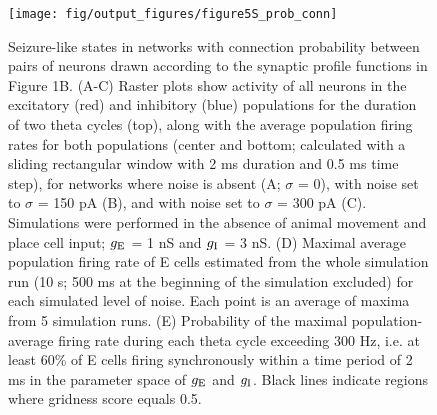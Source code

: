 \documentclass[a4paper,12pt]{article}
\newcommand{\ssc}[3]{\ensuremath{#1_{\text{#2}_{\text{#3}}}}}
\newcommand{\gE      }{\ssc{g}      {\scriptsize{E}}{}}
\newcommand{\gI      }{\ssc{g}      {\scriptsize{I}}{}}
\begin{document}
\clearpage

\begin{figure}[p]
    \internallinenumbers
    \centering
        \texttt{[image: fig/output\_figures/figure5S\_prob\_conn]}
\end{figure}

\clearpage

\begin{figure}[H]
    \internallinenumbers
    \caption{Seizure-like states in networks with connection probability
    between pairs of neurons drawn according to the synaptic profile functions
    in Figure 1B. (A-C) Raster plots show activity of all neurons in the
    excitatory (red) and inhibitory (blue) populations for the duration of two
    theta cycles (top), along with the average population firing rates for both
    populations (center and bottom; calculated with a sliding rectangular
    window with 2 ms duration and 0.5 ms time step), for networks where noise
    is absent (A; $\sigma$ = 0), with noise set to $\sigma$ = 150 pA (B), and
    with noise set to $\sigma$ = 300 pA (C). Simulations were performed in the
    absence of animal movement and place cell input; $\gE$ = 1 nS and $\gI$ = 3 nS.
    (D) Maximal average population firing rate of E cells estimated from the
    whole simulation run (10 s; 500 ms at the beginning of the simulation
    excluded) for each simulated level of noise. Each point is an average of
    maxima from 5 simulation runs.  (E) Probability of the maximal
    population-average firing rate during each theta cycle exceeding 300 Hz,
    i.e. at least 60\% of E cells firing synchronously within a time period of
    2 ms in the parameter space of $\gE$ and $\gI$. Black lines indicate regions
    where gridness score equals 0.5.}
\end{figure}

\clearpage
\end{document}
